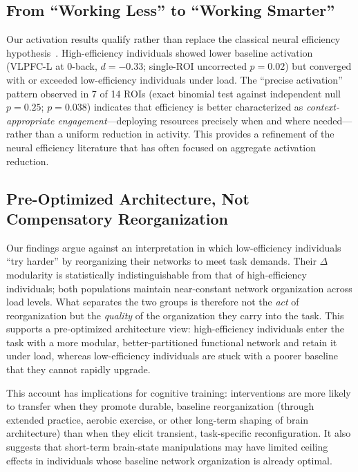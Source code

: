 \documentclass[conference]{IEEEtran}
\begin{document}
\subsection{From ``Working Less'' to ``Working Smarter''}

Our activation results qualify rather than replace the classical neural efficiency hypothesis~\cite{haier1988cortical}. High-efficiency individuals showed lower baseline activation (VLPFC-L at 0-back, $d=-0.33$; single-ROI uncorrected $p=0.02$) but converged with or exceeded low-efficiency individuals under load. The ``precise activation'' pattern observed in 7 of 14 ROIs (exact binomial test against independent null $p=0.25$; $p=0.038$) indicates that efficiency is better characterized as \emph{context-appropriate engagement}---deploying resources precisely when and where needed---rather than a uniform reduction in activity. This provides a refinement of the neural efficiency literature that has often focused on aggregate activation reduction.

\subsection{Pre-Optimized Architecture, Not Compensatory Reorganization}

Our findings argue against an interpretation in which low-efficiency individuals ``try harder'' by reorganizing their networks to meet task demands. Their $\Delta$ modularity is statistically indistinguishable from that of high-efficiency individuals; both populations maintain near-constant network organization across load levels. What separates the two groups is therefore not the \emph{act} of reorganization but the \emph{quality} of the organization they carry into the task. This supports a pre-optimized architecture view: high-efficiency individuals enter the task with a more modular, better-partitioned functional network and retain it under load, whereas low-efficiency individuals are stuck with a poorer baseline that they cannot rapidly upgrade.

This account has implications for cognitive training: interventions are more likely to transfer when they promote durable, baseline reorganization (through extended practice, aerobic exercise, or other long-term shaping of brain architecture) than when they elicit transient, task-specific reconfiguration. It also suggests that short-term brain-state manipulations may have limited ceiling effects in individuals whose baseline network organization is already optimal.
\end{document}
